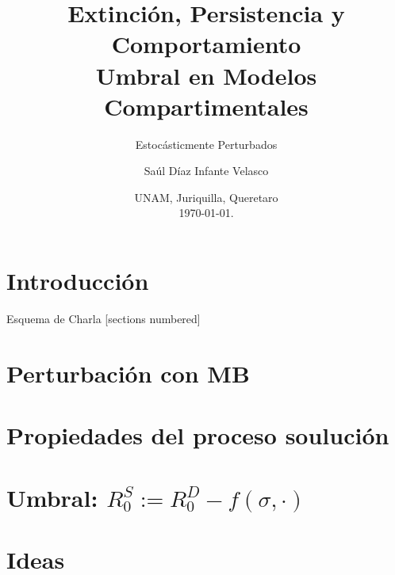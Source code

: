 \documentclass{beamer}
\title{%
    Extinci\'on, Persistencia y Comportamiento %
    \\ Umbral en Modelos Compartimentales %
}%
\subtitle{Estoc\'asticmente Perturbados}
\author{Sa\'ul D\'iaz Infante Velasco}
\institute{
    \color{white}
    CONACYT-Universidad de Sonora \\
    sauldiazinfante@gmail.com
} %
\date{
    \footnotesize
    \color{mainthemecolour} 
    UNAM, 
    Juriquilla, Queretaro  
    \\
    \today. }
\begin{document}
    \maketitle
    \section{Introducci\'on}
        
        
        
        
        \begin{frame}{Esquema de Charla}
            [sections numbered]
            \tableofcontents[hideallsubsections]
        \end{frame}
    \section{Perturbaci\'on con MB}
        
    \section{Propiedades del proceso souluci\'on}
        
    \section{%
        Umbral: %
        $   
            R_0 ^ S := 
                R_0 ^ D 
                -%
                f(\sigma, \cdot)
        $
    }%
        
        
        
    \section{Ideas}
        
\end{document}
